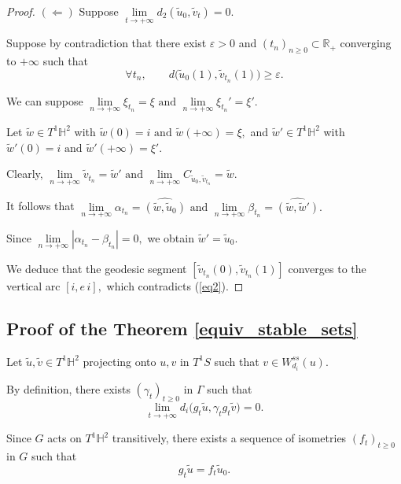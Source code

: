 \documentclass[a4paper,english,reqno]{amsart}
\theoremstyle{definition}
\numberwithin{equation}{section}
\begin{document}
\begin{proof}
\medskip

\noindent
$\left( \Longleftarrow \right)$ Suppose
$
\lim\limits_{t\to+\infty} d_{2}(\tilde u_{0},\tilde v_{t})=0.
$

Suppose by contradiction that there exist $\varepsilon>0$ and $(t_{n})_{n\geq 0}\subset\mathbb R_{+}$
converging to $+\infty$ such that
\begin{equation}\label{eq2}
	\forall t_{n},\qquad d\bigl(\tilde u_{0}(1),\tilde v_{t_{n}}(1)\bigr)\geq \varepsilon.
\end{equation}

We can suppose
$
\lim\limits_{n\to+\infty}\xi_{t_{n}}=\xi
\text{ and }
\lim\limits_{n\to+\infty}\xi_{t_{n}}'=\xi'.
$

Let $\tilde w\in T^{1}\mathbb H^{2}$ with
$
\tilde w(0)=i
\text{ and }
\tilde w(+\infty)=\xi,
$
and $\tilde w'\in T^{1}\mathbb H^{2}$ with
$
\tilde w'(0)=i
\text{ and } 
\tilde w'(+\infty)=\xi'.
$

Clearly,
$
\lim\limits_{n\to+\infty}\tilde v_{t_{n}}=\tilde w'
\text{ and } 
\lim\limits_{n\to+\infty} C_{\tilde u_{0},\tilde v_{t_{n}}}=\tilde w.
$

It follows that
$
\lim\limits_{n\to+\infty}\alpha_{t_{n}}=\widehat{(\tilde w,\tilde u_{0})}
\text{ and } 
\lim\limits_{n\to+\infty}\beta_{t_{n}}=\widehat{(\tilde w,\tilde w')}.
$ 

Since
$
\lim\limits_{n\to+\infty}|\alpha_{t_{n}}-\beta_{t_{n}}|=0,
$
we obtain
$
\tilde w'=\tilde u_{0}.
$

We deduce that the geodesic segment
$
[\tilde v_{t_{n}}(0),\tilde v_{t_{n}}(1)]
$
converges to the vertical arc
$
[i,e\,i],
$
which contradicts (\ref{eq2}).
\end{proof}

\subsection*{Proof of the Theorem \ref{equiv_stable_sets}}

Let $\tilde u,\tilde v\in T^{1}\mathbb H^{2}$ projecting onto $u,v$ in $T^{1}S$ such that
$v\in W_{d_{i}}^{ss}(u)$.

By definition, there exists $(\gamma_{t})_{t\geq 0}$ in $\Gamma$ such that
\[
\lim\limits_{t\to+\infty} d_{i}\bigl(g_{t}\tilde u,\gamma_{t}g_{t}\tilde v\bigr)=0.
\]

Since $G$ acts on $T^{1}\mathbb H^{2}$ transitively, there exists a sequence of isometries $(f_{t})_{t\geq 0}$ in $G$ such that
\[
g_{t}\tilde u=f_{t}\tilde u_{0}.
\]
\end{document}
